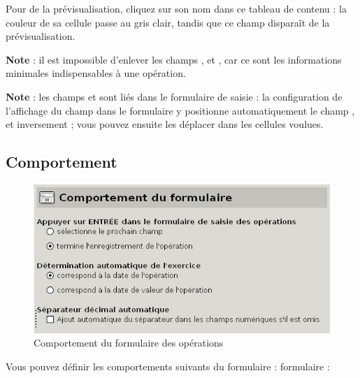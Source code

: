 Pour  de la  prévisualisation, cliquez sur son nom dans ce tableau de contenu : la couleur de sa cellule passe au gris clair, tandis que ce champ disparaît de la prévisualisation.

\textbf{Note} : il est impossible d'enlever les champs  ,  et , car ce sont les informations minimales indispensables à une opération.

\textbf{Note} : les champs  et  sont liés dans le formulaire de saisie : la configuration de l'affichage du champ  dans le formulaire y positionne automatiquement le champ , et inversement ; vous pouvez ensuite les déplacer dans les cellules voulues.


\subsection{Comportement\label{setup-form-behaviour}}

\ifIllustration
\begin{figure}[htbp]
\begin{center}
\includegraphics[scale=0.5]{image/screenshot/setup_formBehaviour}
\end{center}
\caption{Comportement du formulaire des opérations}
\label{setup-formBehaviour-img}
\end{figure}
\fi

Vous pouvez définir les comportements suivants du \ifIllustration formulaire :
\else formulaire :
\fi

